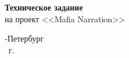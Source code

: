 \begin{titlepage}
    \centering
    \textbf{}
    
	\vfill
	
	\LARGE\textbf{Техническое задание}\\
	на проект <<Mafia Narration>>\\[30mm]
	
	\textbf{}
	
	\vfill
	
	-Петербург\\
	\the\year\ г.
\end{titlepage}
